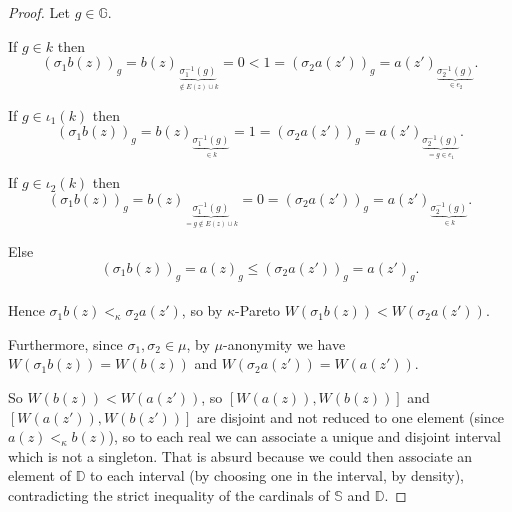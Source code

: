 \documentclass{article}
\begin{document}
\begin{proof}
  Let $g\in\mathbb G$.

  If $g\in k$ then
  \[(\sigma_1 b(z))_g=b(z)_{\underset{\notin E(z)\cup k}
  {\underbrace{\sigma_1^{-1}(g)}}}=0<1=(\sigma_2 a(z'))_g=
  a(z')_{\underset{\in e_2}{\underbrace{\sigma_2^{-1}(g)}}}.\]

  If $g\in \iota_1(k)$ then
  \[(\sigma_1 b(z))_g=b(z)_{\underset{\in k}{\underbrace{\sigma_1^{-1}(g)}}}=
  1=(\sigma_2 a(z'))_g=a(z')_{\underset{=g\in e_1}
  {\underbrace{\sigma_2^{-1}(g)}}}.\]

  If $g\in \iota_2(k)$ then
  \[(\sigma_1 b(z))_g=b(z)_{\underset{=g \notin E(z)\cup k}
  {\underbrace{\sigma_1^{-1}(g)}}}=0=(\sigma_2 a(z'))_g=a(z')_{\underset{\in k}
  {\underbrace{\sigma_2^{-1}(g)}}}.\]

  Else
  \[(\sigma_1 b(z))_g=a(z)_g\leq (\sigma_2 a(z'))_g=a(z')_g.\] \\

  Hence $\sigma_1b(z)<_\kappa \sigma_2a(z')$, so by $\kappa$-Pareto
  $W(\sigma_1b(z))<W(\sigma_2a(z'))$.

  Furthermore, since $\sigma_1,\sigma_2\in\mu$, by $\mu$-anonymity we have
  $W(\sigma_1b(z))=W(b(z))$ and $W(\sigma_2a(z'))=W(a(z'))$.

  So $W(b(z))<W(a(z'))$, so $[W(a(z)),W(b(z))]$ and $[W(a(z')),W(b(z'))]$
  are disjoint and not reduced to one element (since $a(z)<_\kappa b(z)$), so to each real
  we can associate a unique and disjoint interval which is not a singleton. That is absurd because
  we could then associate an element of $\mathbb D$ to each interval (by choosing one in the interval, by density),
  contradicting the strict inequality of the cardinals of $\mathbb S$ and $\mathbb D$.
\end{proof}





\end{document}
